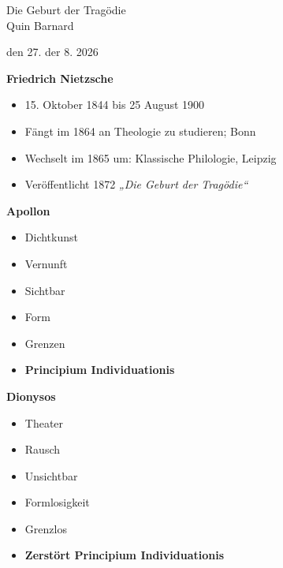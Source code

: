 \documentclass[12pt,a4paper]{article}
\begin{document}
\begin{center}
{\Huge Die Geburt der Tragödie}\\
{\Large Quin Barnard}
\end{center}

\hfill den 27. der 8. 2026

\textbf{\large Friedrich Nietzsche}
\begin{itemize}
    \item 15. Oktober 1844 bis 25 August 1900
    \item Fängt im 1864 an Theologie zu studieren; Bonn
    \item Wechselt im 1865 um: Klassische Philologie, Leipzig
    \item Veröffentlicht 1872 \textit{„Die Geburt der Tragödie“}
\end{itemize}

\noindent
\begin{minipage}[t]{0.48\textwidth}

    \textbf{\Large{Apollon}}
        \begin{itemize}
            \item Dichtkunst
            \item Vernunft
            \item Sichtbar
            \item Form
            \item Grenzen
            \item \textbf{Principium Individuationis}
        \end{itemize}

\end{minipage}
\hfill
\begin{minipage}[t]{0.48\textwidth}

    \textbf{\Large Dionysos}
        \begin{itemize}
            \item Theater
            \item Rausch
            \item Unsichtbar
            \item Formlosigkeit
            \item Grenzlos
            \item \textbf{Zerstört Principium Individuationis}
        \end{itemize}

\end{minipage}
\end{document}
